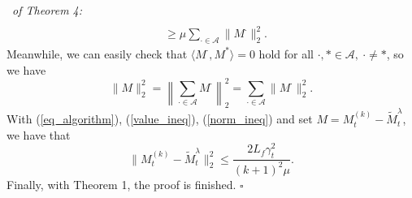 \documentclass[12pt]{article}
\newenvironment{pf}{{\noindent\it Proof}\ }{\hfill $\square$\par}
\begin{document}
\begin{pf}{\it of Theorem 4:}
\begin{equation}
\begin{aligned}
  \\& \ge \mu\sum_{\cdot\in \mathcal{A}}\|M^{\cdot}\|_2^2.
  \end{aligned}
  \end{equation}
  Meanwhile, we can easily check that $\langle M^{\cdot},M^{*}\rangle = 0$ hold  for all $\cdot,*\in \mathcal{A},\ \cdot\not = *$, so we have 
  \begin{equation}
  \label{norm_ineq}
  \|M\|_2^2 = \left\|\sum_{\cdot \in\mathcal{A}}M^{\cdot}\right\|_2^2=\sum_{\cdot\in \mathcal{A}}\|M^{\cdot}\|_2^2.
  \end{equation}
  With (\ref{eq_algorithm}), (\ref{value_ineq}), (\ref{norm_ineq}) and set $M=M^{(k)}_t-\widetilde{M}_t^\lambda$, we have that
  \begin{equation*}
  \|M^{(k)}_t-\widetilde{M}_t^\lambda\|_2^2 \le  \frac{2L_f \gamma_t^2}{(k+1)^2\mu}.
  \end{equation*}
  Finally, with Theorem 1, the proof is finished. 
\end{pf}
\end{document}
